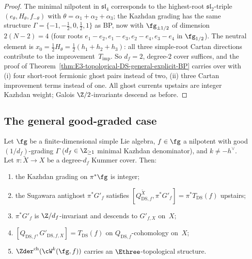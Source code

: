\begin{proof}
The minimal nilpotent in $\mathfrak{sl}_{4}$ corresponds to the
highest-root $\mathfrak{sl}_{2}$-triple $(e_{\theta}, H_{\theta},
f_{-\theta})$ with $\theta = \alpha_{1} + \alpha_{2} + \alpha_{3}$;
the Kazhdan grading has the same structure
$\Gamma = \{-1, -\tfrac{1}{2}, 0, \tfrac{1}{2}, 1\}$ as BP, now
with $\fg_{\pm 1/2}$ of dimension $2(N-2) = 4$ (four roots
$e_{1}-e_{2}, e_{1}-e_{3}, e_{2}-e_{4}, e_{3}-e_{4}$ in
$\fg_{1/2}$). The
neutral element is $x_{0} = \tfrac{1}{2}H_{\theta} =
\tfrac{1}{2}(h_{1} + h_{2} + h_{3})$: all three simple-root Cartan
directions contribute to the improvement~$T_{\mathrm{imp}}$. So
$d_{f} = 2$, degree-$2$ cover suffices, and the proof of
Theorem~\ref{thm:E3-topological-DS-general-explicit-BP} carries
over with (i) four short-root fermionic ghost pairs instead of two,
(ii) three Cartan improvement terms instead of one. All ghost
currents upstairs are integer Kazhdan weight; Galois
$\Z/2$-invariants descend as before.
\end{proof}

\subsection{The general good-graded case}
\label{subsec:fractional-ghost-all-good-graded}

\begin{theorem}
\label{thm:E3-topological-DS-general-all-good-graded}
Let $\fg$ be a finite-dimensional simple Lie algebra,
$f \in \fg$ a nilpotent with good $(1/d_{f})$-grading
$\Gamma$ \textup{(}$d_{f} \in \Z_{\ge 1}$ minimal Kazhdan
denominator\textup{)}, and $k \ne -h^{\vee}$. Let
$\pi\colon \widetilde X \to X$ be a degree-$d_{f}$ Kummer cover.
Then:
\begin{enumerate}[label=\textup{(\arabic*)},nosep]
\item the Kazhdan grading on $\pi^{*}\fg$ is integer;
\item the Sugawara antighost $\pi^{*}G'_{f}$ satisfies
 $[Q_{\mathrm{DS},f}^{\widetilde X}, \pi^{*}G'_{f}]
 = \pi^{*}T_{\mathrm{DS}}(f)$ upstairs;
\item $\pi^{*}G'_{f}$ is $\Z/d_{f}$-invariant and descends to
 $G'_{f, X}$ on~$X$;
\item $[Q_{\mathrm{DS},f}, G'_{\mathrm{DS},f, X}]
 = T_{\mathrm{DS}}(f)$ on
 $Q_{\mathrm{DS},f}$-cohomology on~$X$;
\item $\Zder^{\mathrm{ch}}(\cW^{k}(\fg, f))$ carries an
 $\Ethree$-topological structure.
\end{enumerate}
\end{theorem}

